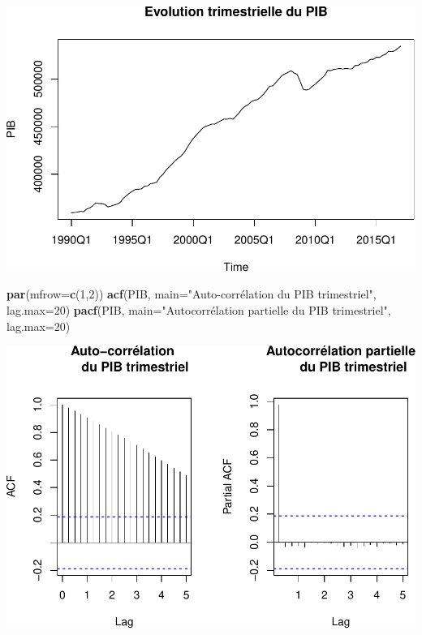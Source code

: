 \documentclass[11pt,]{article}
\newenvironment{Shaded}{\begin{snugshade}}{\end{snugshade}}
\newcommand{\KeywordTok}[1]{\textcolor[rgb]{0.13,0.29,0.53}{\textbf{{#1}}}}
\newcommand{\DataTypeTok}[1]{\textcolor[rgb]{0.13,0.29,0.53}{{#1}}}
\newcommand{\DecValTok}[1]{\textcolor[rgb]{0.00,0.00,0.81}{{#1}}}
\newcommand{\StringTok}[1]{\textcolor[rgb]{0.31,0.60,0.02}{{#1}}}
\newcommand{\NormalTok}[1]{{#1}}
\begin{document}
\includegraphics{doc_files/figure-latex/unnamed-chunk-3-1.pdf}

\begin{Shaded}
\begin{Highlighting}[]
  \KeywordTok{par}\NormalTok{(}\DataTypeTok{mfrow=}\KeywordTok{c}\NormalTok{(}\DecValTok{1}\NormalTok{,}\DecValTok{2}\NormalTok{))}
  \KeywordTok{acf}\NormalTok{(PIB, }\DataTypeTok{main=}\StringTok{"Auto-corrélation }
\StringTok{      du PIB trimestriel"}\NormalTok{, }\DataTypeTok{lag.max=}\DecValTok{20}\NormalTok{)}
  \KeywordTok{pacf}\NormalTok{(PIB, }\DataTypeTok{main=}\StringTok{"Autocorrélation partielle}
\StringTok{       du PIB trimestriel"}\NormalTok{, }\DataTypeTok{lag.max=}\DecValTok{20}\NormalTok{)}
\end{Highlighting}
\end{Shaded}

\includegraphics{doc_files/figure-latex/unnamed-chunk-3-2.pdf}
\end{document}
